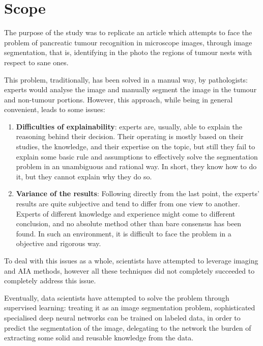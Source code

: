 \section{Scope}

\par
The purpose of the study was to replicate an article which attempts to face the problem of pancreatic tumour recognition in microscope images, through image segmentation, that is, identifying in the photo the regions of tumour nests with respect to sane ones.

\par
This problem, traditionally, has been solved in a manual way, by pathologists: experts would analyse the image and manually segment the image in the tumour and non-tumour portions. However, this approach, while being in general convenient, leads to some issues:

\begin{enumerate}
    \item \textbf{Difficulties of explainability}: 
        experts are, usually, able to explain the reasoning behind their decision. Their operating is mostly based on their studies, 
        the knowledge, and their expertise on the topic, but still they fail to explain some basic rule and assumptions to effectively solve the segmentation problem in an unambiguous and rational way. In short, they know how to do it, but they cannot explain why they do so.
    \item \textbf{Variance of the results}:
        Following directly from the last point, the experts' results are quite subjective and tend to differ from one view to another.
        Experts of different knowledge and experience might come to different conclusion, and no absolute method other than bare consensus has been found. In such an environment, it is difficult to face the problem in a objective and rigorous way. 
\end{enumerate}

\par
To deal with this issues as a whole, scientists have attempted to leverage imaging and AIA methods, however all these techniques did not completely succeeded to completely address this issue.

\par
Eventually, data scientists have attempted to solve the problem through supervised learning: treating it as an image segmentation problem, sophisticated specialised deep neural networks can be trained on labeled data, in order to predict the segmentation of the image, delegating to the network the burden of extracting some solid and reusable knowledge from the data.